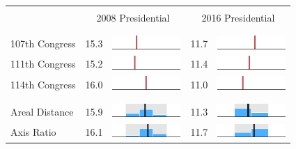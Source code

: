 
\begin{table}
\renewcommand{\arraystretch}{0.7}
 \begin{tabular}{l rm{7em} rm{7em}}
\hline \hline \\

{} & \multicolumn{2}{c}{2008 Presidential} & \multicolumn{2}{c}{2016 Presidential} \\

\\ \hline \\
107th Congress         &  15.3 &          \includegraphics[width=7em]{mini_hist/IL_2008_107} &  11.7 &          \includegraphics[width=7em]{mini_hist/IL_2016_107} \\
111th Congress         &  15.2 &          \includegraphics[width=7em]{mini_hist/IL_2008_111} &  11.4 &          \includegraphics[width=7em]{mini_hist/IL_2016_111} \\
114th Congress         &  16.0 &          \includegraphics[width=7em]{mini_hist/IL_2008_114} &  11.0 &          \includegraphics[width=7em]{mini_hist/IL_2016_114} \\
\\ \hline \\ 
Areal Distance         &  15.9 &       \includegraphics[width=7em]{mini_hist/IL_2008_dist_a} &  11.3 &       \includegraphics[width=7em]{mini_hist/IL_2016_dist_a} \\
Axis Ratio             &  16.1 &   \includegraphics[width=7em]{mini_hist/IL_2008_axis_ratio} &  11.7 &   \includegraphics[width=7em]{mini_hist/IL_2016_axis_ratio} \\

\end{tabular}
\end{table}
